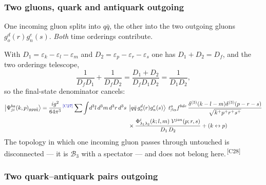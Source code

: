 \documentclass[11pt]{article}
\newcommand{\eps}{\varepsilon}
\newcommand{\dthree}{\delta^{(3)}}
\newcommand{\ket}[1]{\left|#1\right\rangle}
\newcommand{\Ph}{\Phi}
\newcommand{\Vg}{\mathcal{V}}
\newcommand{\qk}[3]{q^{#1}_{#2}(#3)}
\newcommand{\aqk}[3]{\bar q^{#1}_{#2}(#3)}
\newcommand{\gl}[3]{g^{#1}_{#2}(#3)}
\newcommand{\B}{\mathcal{B}}
\newcommand{\chg}[1]{{\color{blue!70!black}\textsuperscript{\,[C#1]}}}
\begin{document}
\subsubsection{Two gluons, quark and antiquark outgoing}

One incoming gluon splits into $q\bar q$, the other into the two outgoing gluons
$\gl{d}{o}{r}\gl{e}{n}{s}$. \emph{Both} time orderings contribute.
\begin{center}
\end{center}
With $D_{1}=\eps_{k}-\eps_{l}-\eps_{m}$ and $D_{2}=\eps_{p}-\eps_{r}-\eps_{s}$ one has
$D_{1}+D_{2}=D_{f}$, and the two orderings telescope,
\begin{equation}
\frac{1}{D_{f}D_{1}}+\frac{1}{D_{f}D_{2}}=\frac{D_{1}+D_{2}}{D_{f}D_{1}D_{2}}=\frac{1}{D_{1}D_{2}},
\label{eq:partialfrac}
\end{equation}
so the final-state denominator cancels:
\begin{align}
\ket{\Psi^{ba}_{ji}(k,p)_{ggq\bar q}}=\frac{ig^{2}}{64\pi^{3}}\chg{27}
\sum\int\!d^{3}l\,d^{3}m\,d^{3}r\,d^{3}s\;
&\ket{q\bar q\,\gl{d}{o}{r}\gl{e}{n}{s}}\;t^{a}_{\beta\alpha}f^{bde}\,
\frac{\dthree(k-l-m)\dthree(p-r-s)}{\sqrt{k^{+}p^{+}r^{+}s^{+}}}
\nonumber\\&\times
\frac{\Ph^{i}_{\lambda_{1}\lambda_{2}}(k;l,m)\;\Vg^{jon}(p;r,s)}{D_{1}\,D_{2}}
+(k\leftrightarrow p)
\label{eq:Pggqq}
\end{align}
The topology in which one incoming gluon passes through untouched is disconnected --- it is
$\B_{3}$ with a spectator --- and does not belong here.\chg{28}

\subsubsection{Two quark--antiquark pairs outgoing}
\end{document}
